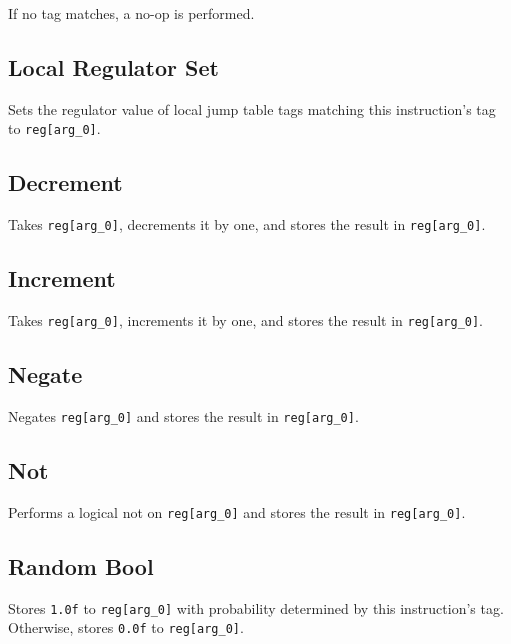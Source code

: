 If no tag matches, a no-op is performed.

\subsection{Local Regulator Set}


Sets the regulator value of local jump table tags matching this instruction's tag to \texttt{reg[arg\_0]}.

\subsection{Decrement}


Takes \texttt{reg[arg\_0]}, decrements it by one, and stores the result in \texttt{reg[arg\_0]}.

\subsection{Increment}


Takes \texttt{reg[arg\_0]}, increments it by one, and stores the result in \texttt{reg[arg\_0]}.

\subsection{Negate}


Negates \texttt{reg[arg\_0]} and stores the result in \texttt{reg[arg\_0]}.

\subsection{Not}


Performs a logical not on \texttt{reg[arg\_0]} and stores the result in \texttt{reg[arg\_0]}.

\subsection{Random Bool}


Stores \texttt{1.0f} to \texttt{reg[arg\_0]} with probability determined by this instruction's tag.
Otherwise, stores \texttt{0.0f} to \texttt{reg[arg\_0]}.

